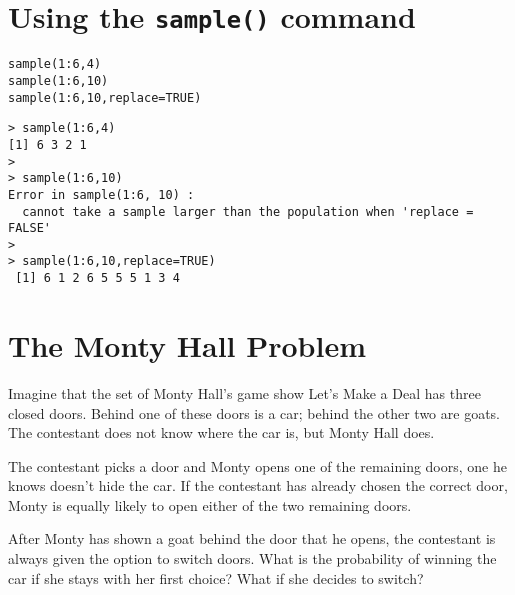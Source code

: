\documentclass[12pt,a4paper]{article}
\begin{document}
\begin{titlepage}
\newpage
\section{Using the \texttt{sample()} command}
\large
\begin{framed}
\begin{verbatim}
sample(1:6,4)
sample(1:6,10)
sample(1:6,10,replace=TRUE)
\end{verbatim}
\end{framed}
\begin{shaded}
\begin{framed}
\normalsize{\color{BrickRed}
\begin{verbatim}
> sample(1:6,4)
[1] 6 3 2 1
>
> sample(1:6,10)
Error in sample(1:6, 10) :
  cannot take a sample larger than the population when 'replace = FALSE'
>
> sample(1:6,10,replace=TRUE)
 [1] 6 1 2 6 5 5 5 1 3 4
\end{verbatim}}
\end{framed}
\end{shaded}

\newpage
\section{The Monty Hall Problem}
Imagine that the set of Monty Hall's game show Let's Make a Deal has three closed doors. Behind one of these doors is a car; behind the other two are goats. The contestant does not know where the car is, but Monty Hall does.

The contestant picks a door and Monty opens one of the remaining doors, one he knows doesn't hide the car. If the contestant has already chosen the correct door, Monty is equally likely to open either of the two remaining doors.

After Monty has shown a goat behind the door that he opens, the contestant is always given the option to switch doors. What is the probability of winning the car if she stays with her first choice? What if she decides to switch?




\end{titlepage}
\end{document}
